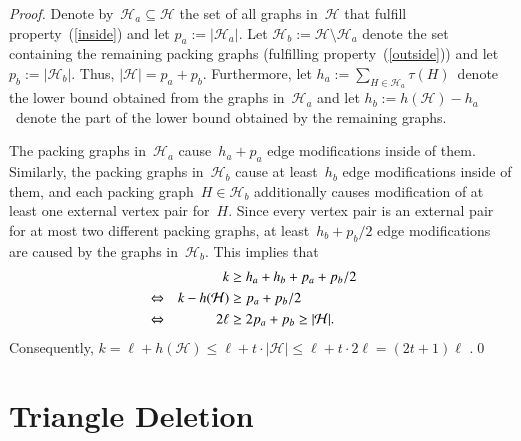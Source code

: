 \documentclass[envcountsame,numbook,smallextended]{svjour3}
\numberwithin{equation}{section}
\numberwithin{figure}{section}
\newcommand{\tffedv}{\textsc{$F$-free Editing with Cost-$t$ Packing}}
\newcommand{\packing}{\ensuremath{\mathcal H}}
\begin{document}
\begin{proof}
    Denote by~$\packing_a\subseteq\packing$ the set of all graphs in~$\packing$ that fulfill
  property~(\ref{inside}) and let $p_a:=|\packing_a|$.
  Let $\packing_b:=\packing\setminus \packing_a$ denote the
  set containing the remaining packing graphs (fulfilling property~(\ref{outside})) and let $p_b:=|\packing_b|$.
  Thus, $|\packing|=p_a + p_b$.
  Furthermore, let $h_a:=\sum_{H\in\packing_a}\tau(H)$~denote the lower bound obtained from the graphs in~$\packing_a$ and let $h_b:=h(\packing)-h_a$~denote the part of the lower bound obtained by the remaining graphs.

  The packing graphs in~$\packing_a$ cause~$h_a+p_a$ edge modifications inside of them. Similarly, the packing graphs in~$\packing_b$ cause at least~$h_b$ edge modifications inside of them, and each packing graph~$H\in \packing_b$ additionally causes modification of at least one external vertex pair for~$H$. Since every vertex pair is an external pair for at most two different packing graphs, at least~$h_b+p_b/2$ edge modifications are caused by the graphs in~$\packing_b$.  This implies that
  \begin{align*}\allowdisplaybreaks
    && k&\ge h_a+h_b+p_a+p_b/2& \\
    \Leftrightarrow && k-h(\packing)&\ge p_a+p_b/2& \\
    \Leftrightarrow && 2\ell&\ge 2p_a+p_b\ge |\packing|.
  \end{align*}
Consequently,  $k = \ell+h(\packing)\le \ell + t\cdot
  |\packing|\le \ell + t\cdot 2\ell=(2t+1)\ell$ .\qed
\end{proof}

\section{Triangle Deletion}
\label{sec:triangle-free}
\end{document}
